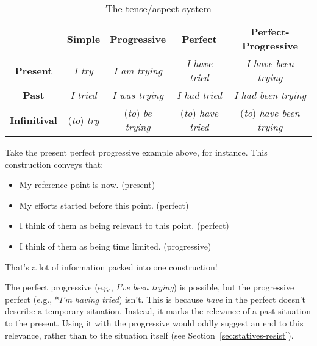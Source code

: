 \begin{table}[ht]
    \centering
    \begin{tabular}{ccccc}
        & \textbf{Simple} & \textbf{Progressive} & \textbf{Perfect} & \textbf{Perfect-Progressive} \\
        \textbf{Present} & 
        \textit{I try} & 
        \textit{I am trying} & 
        \textit{I have tried} & 
        \textit{I have been trying} \\
        \textbf{Past} & 
        \textit{I tried} & 
        \textit{I was trying} & 
        \textit{I had tried} & 
        \textit{I had been trying} \\
        \textbf{Infinitival} & 
        (\textit{to})\textit{ try} & 
        (\textit{to})\textit{ be trying} & 
        (\textit{to})\textit{ have tried} & 
        (\textit{to})\textit{ have been trying} \\
    \end{tabular}
    \caption{The tense/aspect system}
    \label{tab:tense-aspect}
\end{table}

Take the present perfect progressive example above, for instance. This construction conveys that:

\begin{itemize}[nosep]
    \item My reference point is now. \hfill(present)
    \item My efforts started before this point. \hfill(perfect)
    \item I think of them as being relevant to this point. \hfill(perfect)
    \item I think of them as being time limited. \hfill(progressive)
\end{itemize}
That's a lot of information packed into one construction! 

\begin{tcolorbox}[title=No progressive perfect, colback=white, colframe=purple!75!black, fonttitle=\bfseries]


The perfect progressive (e.g., \textit{I've been trying}) is possible, but the progressive perfect (e.g., *\textit{I'm having tried}) isn't. This is because \textit{have} in the perfect doesn't describe a temporary situation. Instead, it marks the relevance of a past situation to the present. Using it with the progressive would oddly suggest an end to this relevance, rather than to the situation itself (see Section~\ref{sec:statives-resist}).
\end{tcolorbox}

